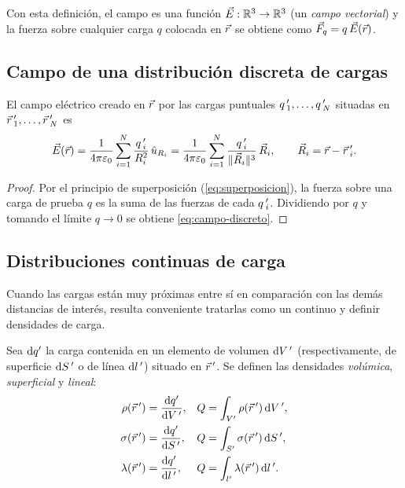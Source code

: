 Con esta definición, el campo es una función $\vec{E}:\mathbb{R}^{3}\to\mathbb{R}^{3}$ (un \emph{campo vectorial}) y la fuerza
sobre cualquier carga $q$ colocada en $\vec{r}$ se obtiene como $\vec{F}_q=q\,\vec{E}(\vec{r})$.



\subsection{Campo de una distribución discreta de cargas}\label{sec:campo-discreto}
\begin{proposicion}\label{prop:campo-discreto}
El campo eléctrico creado en $\vec{r}$ por las cargas puntuales $q\,'_1,\dots,q\,'_N$ situadas en
$\vec{r}\,'_1,\dots,\vec{r}\,'_N$ es
\begin{equation}\label{eq:campo-discreto}
  \vec{E}(\vec{r})=\frac{1}{4\pi\varepsilon_{0}}\sum_{i=1}^{N}\frac{q\,'_i}{R_i^{2}}\,\hat{u}_{R_i}
  =\frac{1}{4\pi\varepsilon_{0}}\sum_{i=1}^{N}\frac{q\,'_i}{\lVert \vec{R}_i\rVert^{3}}\,\vec{R}_i,\qquad
  \vec{R}_i=\vec{r}-\vec{r}\,'_i .
\end{equation}
\end{proposicion}
\begin{proof}
Por el principio de superposición (\cref{eq:superposicion}), la fuerza sobre una carga de prueba $q$ es la
suma de las fuerzas de cada $q\,'_i$. Dividiendo por $q$ y tomando el límite $q\to0$ se obtiene
\cref{eq:campo-discreto}.
\end{proof}

\subsection{Distribuciones continuas de carga}\label{sec:campo-continuo}
Cuando las cargas están muy próximas entre sí en comparación con las demás distancias de interés, resulta conveniente
tratarlas como un continuo y definir densidades de carga.

\begin{definicion}\label{def:densidades}
Sea $\mathrm{d} q'$ la carga contenida en un elemento de volumen $\mathrm{d} V\,'$ (respectivamente, de superficie $\mathrm{d} S\,'$ o de
línea $\mathrm{d} l\,'$) situado en $\vec{r}\,'$. Se definen las densidades \emph{volúmica}, \emph{superficial} y \emph{lineal}:
\begin{align}
  \rho(\vec{r}\,')&=\frac{\mathrm{d} q'}{\mathrm{d} V\,'}, & Q&=\int_{V'}\rho(\vec{r}\,')\,\mathrm{d} V\,',\label{eq:rho}\\
  \sigma(\vec{r}\,')&=\frac{\mathrm{d} q'}{\mathrm{d} S\,'}, & Q&=\int_{S'}\sigma(\vec{r}\,')\,\mathrm{d} S\,',\label{eq:sigma}\\
  \lambda(\vec{r}\,')&=\frac{\mathrm{d} q'}{\mathrm{d} l\,'}, & Q&=\int_{l'}\lambda(\vec{r}\,')\,\mathrm{d} l\,'.\label{eq:lambda}
\end{align}
\end{definicion}

